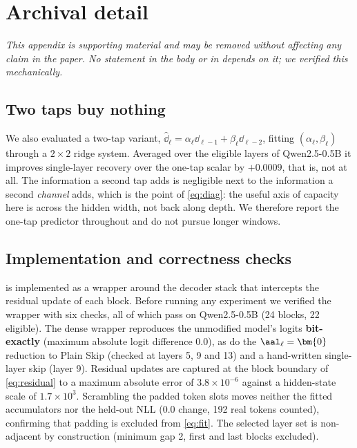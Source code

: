 \clearpage
\section{Archival detail}
\label{sec:app-archival}

\emph{This appendix is supporting material and may be removed without affecting any claim in the
paper. No statement in the body or in  depends on it; we verified this
mechanically.}
\subsection{Two taps buy nothing}
\label{sec:app-ar2}

We also evaluated a two-tap variant, $\widehat{\dd}_\ell = \alpha_\ell \dd_{\ell-1}
+ \beta_\ell \dd_{\ell-2}$, fitting $(\alpha_\ell, \beta_\ell)$ through a
$2\times2$ ridge system. Averaged over the eligible layers of Qwen2.5-0.5B it
improves single-layer recovery over the one-tap scalar by $+0.0009$, that
is, not at all. The information a second tap adds is negligible next to the
information a second \emph{channel} adds, which is the point of \cref{eq:diag}: the
useful axis of capacity here is across the hidden width, not back along depth. We
therefore report the one-tap predictor throughout and do not pursue longer windows.

\subsection{Implementation and correctness checks}
\label{sec:app-correctness}

\mname is implemented as a wrapper around the decoder stack that intercepts the
residual update of each block. Before running any experiment we verified the
wrapper with six checks, all of which pass on Qwen2.5-0.5B (24 blocks, 22
eligible). The dense wrapper reproduces the unmodified model's logits
\textbf{bit-exactly} (maximum absolute logit difference $0.0$), as do the
$\aal_\ell = \bm{0}$ reduction to Plain Skip (checked at layers 5, 9 and
13) and a hand-written single-layer skip (layer 9). Residual updates are
captured at the block boundary of \cref{eq:residual} to a maximum absolute error of
$3.8 \times 10^{-6}$ against a hidden-state scale of $1.7 \times 10^{3}$.
Scrambling the padded token slots moves neither the fitted accumulators nor the
held-out NLL ($0.0$ change, 192 real tokens counted), confirming that
padding is excluded from \cref{eq:fit}. The selected layer set is non-adjacent by
construction (minimum gap 2, first and last blocks excluded).

